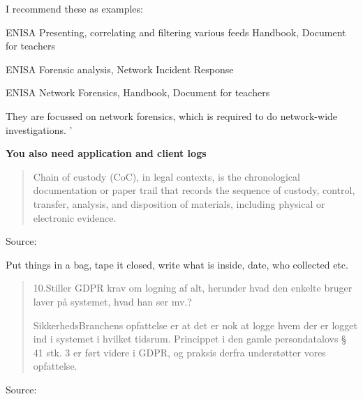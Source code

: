 \documentclass[Screen16to9,17pt]{foils}
\begin{document}
\begin{list2}
\item I recommend these as examples:
\item ENISA Presenting, correlating and filtering various feeds Handbook, Document for teachers\\ 
\item ENISA Forensic analysis, Network Incident Response\\ 
\item ENISA Network Forensics, Handbook, Document for teachers\\ 
\end{list2}

They are focussed on network forensics, which is required to do network-wide investigations. '

{\bf You also need application and client logs}




\begin{quote}
Chain of custody (CoC), in legal contexts, is the chronological documentation or paper trail that records the sequence of custody, control, transfer, analysis, and disposition of materials, including physical or electronic evidence.
\end{quote}
Source: 

\begin{list2}
\item Put things in a bag, tape it closed, write what is inside, date, who collected etc.
\end{list2}




\begin{quote}
  10.Stiller GDPR krav om logning af alt, herunder hvad den enkelte bruger laver på
  systemet, hvad han ser mv.?

  SikkerhedsBranchens opfattelse er at det er nok at logge hvem der er logget ind i
  systemet i hvilket tidsrum. Princippet i den gamle persondatalovs § 41 stk. 3 er
  ført videre i GDPR, og praksis derfra understøtter vores opfattelse.
\end{quote}
Source: 
\end{document}
